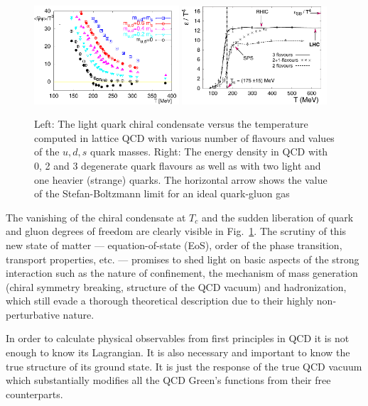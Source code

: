\begin{figure}[htb]
\centering
\includegraphics[width=0.48\textwidth]{introduction/latt_qcd_chiral_vs_T}
\includegraphics*[width=0.48\textwidth]{introduction/latt_qcd_EoS}
\caption{Left: The light quark chiral condensate versus the temperature computed in lattice QCD
with various number of flavours and values of the $u,d,s$ quark masses.
Right: The energy density in QCD with 0, 2 and 3 degenerate quark flavours as well as with two light
and one heavier (strange) quarks. %
The horizontal arrow shows the value of the Stefan-Boltzmann limit for
an ideal quark-gluon gas}
\label{fig:latt_EoS}
\end{figure}
The vanishing of the chiral condensate at $T_c$ and the sudden liberation of quark and gluon
degrees of freedom are clearly visible in Fig.~\ref{fig:latt_EoS}. The scrutiny of this new state of
matter --- equation-of-state (EoS), order of the phase transition, transport properties, etc. ---
promises to shed light on basic aspects of the strong interaction such as the nature of confinement,
the mechanism of mass generation (chiral symmetry breaking, structure of the QCD vacuum)
and hadronization, which still evade a thorough theoretical description 
due to their highly non-perturbative nature.

In order to calculate physical observables from first principles in QCD it is not enough to
know its Lagrangian. It is also necessary and important to know the true structure of its ground state.
It is just the response of the true QCD vacuum which substantially modifies all the QCD
Green’s functions from their free counterparts.

